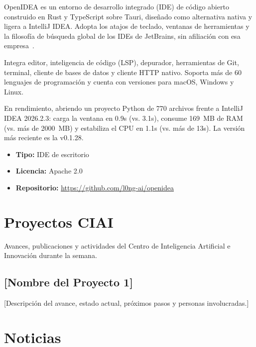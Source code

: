 \documentclass[conference]{IEEEtran}
\begin{document}
OpenIDEA es un entorno de desarrollo integrado (IDE) de código abierto
construido en Rust y TypeScript sobre Tauri, diseñado como alternativa
nativa y ligera a IntelliJ IDEA. Adopta los atajos de teclado, ventanas
de herramientas y la filosofía de búsqueda global de los IDEs de
JetBrains, sin afiliación con esa empresa~\cite{openidea}.

Integra editor, inteligencia de código (LSP), depurador, herramientas
de Git, terminal, cliente de bases de datos y cliente HTTP nativo.
Soporta más de 60 lenguajes de programación y cuenta con versiones para
macOS, Windows y Linux.

En rendimiento, abriendo un proyecto Python de 770 archivos frente a
IntelliJ IDEA 2026.2.3: carga la ventana en 0.9s (vs. 3.1s), consume
169~MB de RAM (vs. más de 2000~MB) y estabiliza el CPU en 1.1s
(vs. más de 13s). La versión más reciente es la v0.1.28.

\begin{itemize}
  \item \textbf{Tipo:} IDE de escritorio
  \item \textbf{Licencia:} Apache 2.0
  \item \textbf{Repositorio:} \url{https://github.com/l0ng-ai/openidea}
\end{itemize}

\section{Proyectos CIAI}

Avances, publicaciones y actividades del Centro de Inteligencia
Artificial e Innovación durante la semana.

\subsection{[Nombre del Proyecto 1]}

[Descripción del avance, estado actual, próximos pasos y personas
involucradas.]

\section{Noticias}
\end{document}
